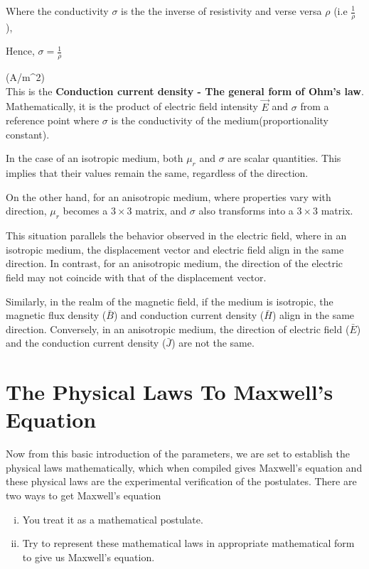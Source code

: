 Where the conductivity $ \sigma $ is the the inverse of resistivity and verse versa $ \rho $ (i.e $ \frac{1}{\rho} $ ), 


Hence, $ \sigma = \frac{1}{\rho}$

\quad (A/m^{2})\\


This is the \textbf{Conduction current density - The general form of Ohm's law}. Mathematically, it is the product of electric field intensity $\vec{E}$ and $\sigma$ from a reference point where $\sigma$ is the conductivity of the medium(proportionality constant).

In the case of an isotropic medium, both \( \mu_r \) and \( \sigma \) are scalar quantities. This implies that their values remain the same, regardless of the direction.

On the other hand, for an anisotropic medium, where properties vary with direction, \( \mu_r \) becomes a \( 3 \times 3 \) matrix, and \( \sigma \) also transforms into a \( 3 \times 3 \) matrix.

This situation parallels the behavior observed in the electric field, where in an isotropic medium, the displacement vector and electric field align in the same direction. In contrast, for an anisotropic medium, the direction of the electric field may not coincide with that of the displacement vector.

Similarly, in the realm of the magnetic field, if the medium is isotropic, the magnetic flux density (\( \bar{B} \)) and conduction current density (\( \bar{H} \)) align in the same direction. Conversely, in an anisotropic medium, the direction of electric field (\( \bar{E} \)) and the conduction current density (\( \bar{J} \)) are not the same.




\section{The Physical Laws To Maxwell's Equation}
Now from this basic introduction of the parameters, we are set to establish the physical laws mathematically, which when compiled gives Maxwell's equation and these physical laws are the experimental verification of the postulates. There are two ways to get Maxwell's equation
\begin{enumerate}[(i)]
	\item You treat it as a mathematical postulate.
	\item Try to represent these mathematical laws in appropriate mathematical form to give us Maxwell's equation.
\end{enumerate}

